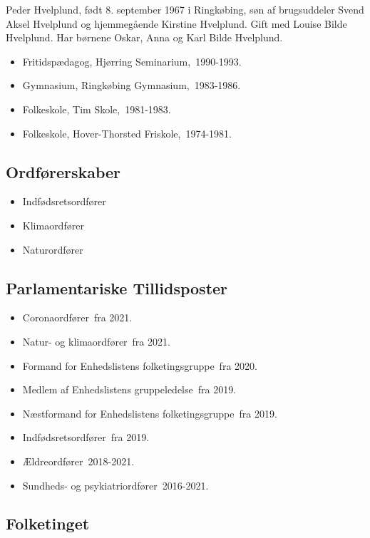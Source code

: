 \documentclass[11pt, a4paper]{awesome-cv}
\begin{document}
\makecvheader[R]
\makelettertitle
\begin{cvletter}
Peder Hvelplund, født 8. september 1967 i Ringkøbing, søn af brugsuddeler Svend Aksel Hvelplund og hjemmegående Kirstine Hvelplund. Gift med Louise Bilde Hvelplund. Har børnene Oskar, Anna og Karl Bilde Hvelplund. 

\begin{itemize}
\item Fritidspædagog, Hjørring Seminarium, 1990-1993.
\item Gymnasium, Ringkøbing Gymnasium, 1983-1986.
\item Folkeskole, Tim Skole, 1981-1983.
\item Folkeskole, Hover-Thorsted Friskole, 1974-1981.
\end{itemize}
\subsection*{Ordførerskaber}
\begin{itemize}
\item Indfødsretsordfører
\item Klimaordfører
\item Naturordfører
\end{itemize}
\subsection*{Parlamentariske Tillidsposter}
\begin{itemize}
\item Coronaordfører fra 2021.
\item Natur- og klimaordfører fra 2021.
\item Formand for Enhedslistens folketingsgruppe fra 2020.
\item Medlem af Enhedslistens gruppeledelse fra 2019.
\item Næstformand for Enhedslistens folketingsgruppe fra 2019.
\item Indfødsretsordfører fra 2019.
\item Ældreordfører 2018-2021.
\item Sundheds- og psykiatriordfører 2016-2021.
\end{itemize}
\subsection*{Folketinget}

\end{cvletter}
\end{document}
